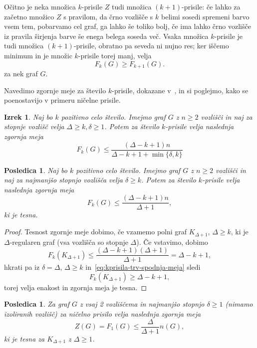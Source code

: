 \documentclass[12pt,a4paper,twoside]{article}
\theoremstyle{definition} %
\theoremstyle{plain} %
\newtheorem{izrek}[definicija]{Izrek}
\newtheorem{posledica}[definicija]{Posledica}
\numberwithin{equation}{section}  %
\begin{document}
Očitno je neka množica $k$-prisile $Z$ tudi množica $(k+1)$-prisile: če lahko za začetno množico $Z$ s pravilom, da črno vozlišče s $k$ belimi sosedi spremeni barvo vsem tem, pobarvamo cel graf, ga lahko še toliko bolj, če ima lahko črno vozlišče iz pravila širjenja barve še enega belega soseda več. Vsaka množica $k$-prisile je tudi množica $(k+1)$-prisile, obratno pa seveda ni nujno res; ker iščemo minimum in je množic $k$-prisile torej manj, velja
\[ F_{k}(G) \geq F_{k+1}(G). \]
za nek graf $G$.

Navedimo zgornje meje za število $k$-prisile, dokazane v~\cite{amos2015kforcing}, in si poglejmo, kako se poenostavijo v primeru ničelne prisile.

\begin{izrek}{\cite[izrek 3.4]{amos2015kforcing}}
    Naj bo $k$ pozitivno celo število. Imejmo graf $G$ z $n \geq 2$ vozlišči in naj za stopnje vozlišč velja $\Delta \geq k, \delta \geq 1$. Potem za število $k$-prisile velja naslednja zgornja meja
    \begin{equation}
        \label{eq:kprisila-zgornja-meja}
        F_k(G) \leq \frac{(\Delta - k + 1)n}{\Delta - k + 1 + \min\{\delta,k\}}
    \end{equation}
\end{izrek}

\begin{posledica}
    Naj bo $k$ pozitivno celo število. Imejmo graf $G$ z $n \geq 2$ vozlišči in naj za najmanjšo stopnjo vozlišča velja $\delta \geq k$. Potem za število $k$-prisile velja naslednja zgornja meja
    \[ F_k(G) \leq \frac{(\Delta - k + 1) n}{\Delta + 1}, \]
    ki je tesna.
\end{posledica}
\begin{proof}
    Tesnost zgornje meje dobimo, če vzamemo polni graf $K_{\Delta + 1}$, $\Delta \geq k$, ki je $\Delta$-regularen graf (vsa vozlišča so stopnje $\Delta$). Če vstavimo, dobimo
    \[ F_k(K_{\Delta + 1}) \leq \frac{(\Delta - k + 1) (\Delta + 1)}{\Delta + 1} = \Delta - k +1, \]
    hkrati pa iz $\delta = \Delta$, $\Delta \geq k$ in~\eqref{eq:kprisila-trv-spodnja-meja} sledi
    \[ F_k(K_{\Delta + 1}) \geq \Delta - k +1, \]
    torej velja enakost in zgornja meja je tesna.
\end{proof}

\begin{posledica}
    Za graf $G$ z vsaj 2 vozliščema in najmanjšo stopnjo $\delta \geq 1$ (nimamo izoliranih vozlišč) za ničelno prisilo velja naslednja zgornja meja
    \begin{equation}
        \label{eq:zgornja-meja-zf}
        Z(G) = F_1(G) \leq \frac{\Delta}{\Delta + 1} n(G),
    \end{equation}
    ki je tesna za $K_{\Delta + 1}$ z $\Delta \geq 1$.
\end{posledica}
\end{document}
